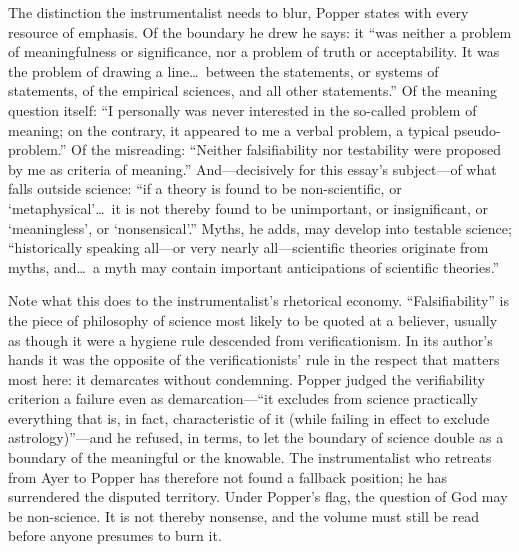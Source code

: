 The distinction the instrumentalist needs to blur, Popper states with every resource of emphasis. Of the boundary he drew he says: it ``was neither a problem of meaningfulness or significance, nor a problem of truth or acceptability. It was the problem of drawing a line\ldots\ between the statements, or systems of statements, of the empirical sciences, and all other statements.'' Of the meaning question itself: ``I personally was never interested in the so-called problem of meaning; on the contrary, it appeared to me a verbal problem, a typical pseudo-problem.'' Of the misreading: ``Neither falsifiability nor testability were proposed by me as criteria of meaning.'' And---decisively for this essay's subject---of what falls outside science: ``if a theory is found to be non-scientific, or `metaphysical'\ldots\ it is not thereby found to be unimportant, or insignificant, or `meaningless', or `nonsensical'.'' Myths, he adds, may develop into testable science; ``historically speaking all---or very nearly all---scientific theories originate from myths, and\ldots\ a myth may contain important anticipations of scientific theories.''

Note what this does to the instrumentalist's rhetorical economy. ``Falsifiability'' is the piece of philosophy of science most likely to be quoted at a believer, usually as though it were a hygiene rule descended from verificationism. In its author's hands it was the opposite of the verificationists' rule in the respect that matters most here: it demarcates without condemning. Popper judged the verifiability criterion a failure even as demarcation---``it excludes from science practically everything that is, in fact, characteristic of it (while failing in effect to exclude astrology)''---and he refused, in terms, to let the boundary of science double as a boundary of the meaningful or the knowable. The instrumentalist who retreats from Ayer to Popper has therefore not found a fallback position; he has surrendered the disputed territory. Under Popper's flag, the question of God may be non-science. It is not thereby nonsense, and the volume must still be read before anyone presumes to burn it.

